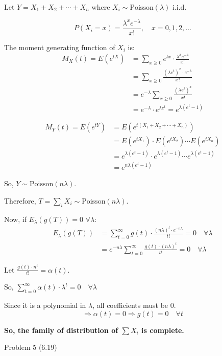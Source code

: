 \documentclass[12pt,a4paper,onecolumn]{exam}
\newcommand{\questionheader}[1]{%
  \begin{tcolorbox}[
    enhanced,
    colback=black,
    coltext=white,
    boxrule=0pt,
    fontupper=\Large\bfseries,
    arc=4mm
  ]
  #1
  \end{tcolorbox}%
}
\begin{document}
\begin{solution}
Let $Y = X_1 + X_2 + \cdots + X_n$ where $X_i \sim \text{Poisson}(\lambda)$ i.i.d.

\[
P(X_i = x) = \frac{\lambda^x e^{-\lambda}}{x!}, \quad x = 0, 1, 2, \ldots
\]

The moment generating function of $X_i$ is:
\begin{align*}
M_X(t) = E(e^{tX}) &= \sum_{x \geq 0} e^{tx} \cdot \frac{\lambda^x e^{-\lambda}}{x!} \\
&= \sum_{x \geq 0} \frac{(\lambda e^t)^x \cdot e^{-\lambda}}{x!} \\
&= e^{-\lambda} \sum_{x \geq 0} \frac{(\lambda e^t)^x}{x!} \\
&= e^{-\lambda} \cdot e^{\lambda e^t} = e^{\lambda(e^t - 1)}
\end{align*}

\begin{align*}
M_Y(t) = E(e^{tY}) &= E(e^{t(X_1 + X_2 + \cdots + X_n)}) \\
&= E(e^{tX_1}) \cdot E(e^{tX_2}) \cdots E(e^{tX_n}) \\
&= e^{\lambda(e^t - 1)} \cdot e^{\lambda(e^t - 1)} \cdots e^{\lambda(e^t - 1)} \\
&= e^{n\lambda(e^t - 1)}
\end{align*}

So, $Y \sim \text{Poisson}(n\lambda)$.

Therefore, $T = \sum_i X_i \sim \text{Poisson}(n\lambda)$.

Now, if $E_{\lambda}(g(T)) = 0$ $\forall \lambda$:
\begin{align*}
E_{\lambda}(g(T)) &= \sum_{t=0}^{\infty} g(t) \cdot \frac{(n\lambda)^t \cdot e^{-n\lambda}}{t!} = 0 \quad \forall \lambda \\
&= e^{-n\lambda} \sum_{t=0}^{\infty} \frac{g(t) \cdot (n\lambda)^t}{t!} = 0 \quad \forall \lambda
\end{align*}

Let $\frac{g(t) \cdot n^t}{t!} = \alpha(t)$.

So, $\sum_{t=0}^{\infty} \alpha(t) \cdot \lambda^t = 0 \quad \forall \lambda$

Since it is a polynomial in $\lambda$, all coefficients must be 0.
\[
\Rightarrow \alpha(t) = 0 \Rightarrow g(t) = 0 \quad \forall t
\]

\textbf{So, the family of distribution of $\sum X_i$ is complete.}
\end{solution}

\questionheader{Problem 5 (6.19)}
\end{document}
